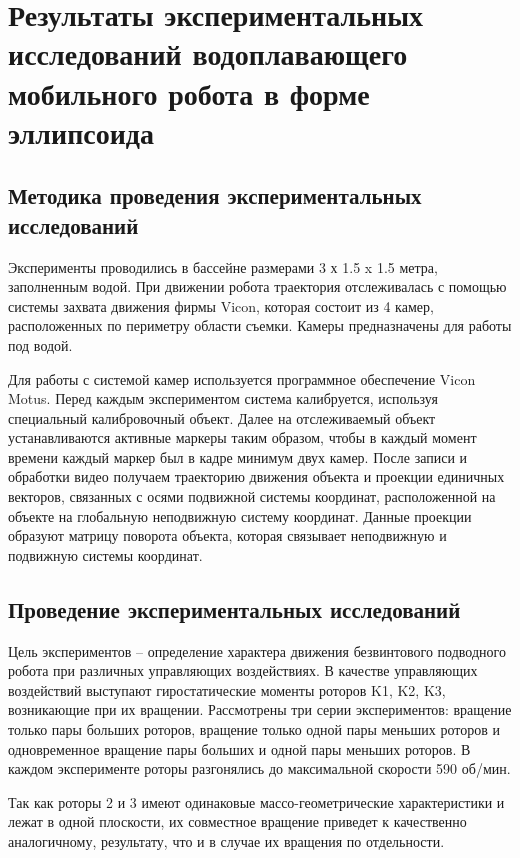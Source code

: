 \chapter{Результаты экспериментальных исследований водоплавающего мобильного робота в форме эллипсоида}\label{ch:ch4}

\section{Методика проведения экспериментальных исследований}\label{sec:ch4/sec1}

Эксперименты проводились в бассейне размерами 3 х 1.5 x 1.5 метра, заполненным водой. При движении робота траектория отслеживалась с помощью системы захвата движения фирмы Vicon, которая состоит из 4 камер, расположенных по периметру области съемки. Камеры предназначены для работы под водой. 

Для работы с системой камер используется программное обеспечение Vicon Motus. Перед каждым экспериментом система калибруется, используя специальный калибровочный объект. Далее на отслеживаемый объект устанавливаются активные маркеры таким образом, чтобы в каждый момент времени каждый маркер был в кадре минимум двух камер. После записи и обработки видео получаем траекторию движения объекта и проекции единичных векторов, связанных с осями подвижной системы координат, расположенной на объекте на глобальную неподвижную систему координат. Данные проекции образуют матрицу поворота объекта, которая связывает неподвижную и подвижную системы координат.

\section{Проведение экспериментальных исследований}\label{subsec:ch4/sec2/sub1}

Цель экспериментов -- определение характера движения безвинтового подводного робота при различных управляющих воздействиях. В качестве управляющих воздействий выступают гиростатические моменты роторов K1, K2, K3, возникающие при их вращении. Рассмотрены три серии экспериментов: вращение только пары больших роторов, вращение только одной пары меньших роторов и одновременное вращение пары больших и одной пары меньших роторов. В каждом эксперименте роторы разгонялись до максимальной скорости 590 об/мин.

Так как роторы 2 и 3 имеют одинаковые массо-геометрические характеристики и лежат в одной плоскости, их совместное вращение приведет к качественно аналогичному, результату, что и в случае их вращения по отдельности.


